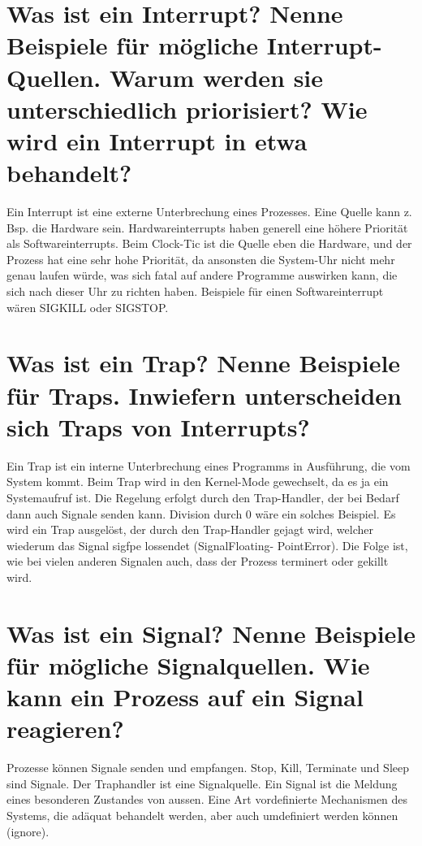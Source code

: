 \documentclass[12pt,a4paper,ngerman]{scrartcl}
\newcommand{\question}[1]{#1}
\newenvironment {answer}
                {}
                {}
\begin{document}
\section{\question{Was ist ein Interrupt? Nenne Beispiele für mögliche Interrupt-Quellen. Warum werden sie unterschiedlich priorisiert? Wie wird ein Interrupt in etwa behandelt?}}
\begin{answer}
Ein Interrupt ist eine externe Unterbrechung eines Prozesses. Eine Quelle kann z. Bsp. die
Hardware sein. Hardwareinterrupts haben generell eine höhere Priorität als Softwareinterrupts.
Beim Clock-Tic ist die Quelle eben die Hardware, und der Prozess hat eine sehr hohe
Priorität, da ansonsten die System-Uhr nicht mehr genau laufen würde, was sich fatal auf
andere Programme auswirken kann, die sich nach dieser Uhr zu richten haben.
Beispiele für einen Softwareinterrupt wären SIGKILL oder SIGSTOP.
\end{answer}

\section{\question{Was ist ein Trap? Nenne Beispiele für Traps. Inwiefern unterscheiden sich Traps von Interrupts?}}
\begin{answer}
Ein Trap ist ein interne Unterbrechung eines Programms in Ausführung, die vom System
kommt. Beim Trap wird in den Kernel-Mode gewechselt, da es ja ein Systemaufruf ist.
Die Regelung erfolgt durch den Trap-Handler, der bei Bedarf dann auch Signale senden
kann. Division durch 0 wäre ein solches Beispiel. Es wird ein Trap ausgelöst, der durch den
Trap-Handler gejagt wird, welcher wiederum das Signal sigfpe lossendet (SignalFloating-
PointError). Die Folge ist, wie bei vielen anderen Signalen auch, dass der Prozess terminert
oder gekillt wird.
\end{answer}

\section{\question{Was ist ein Signal? Nenne Beispiele für mögliche Signalquellen. Wie kann ein Prozess auf ein Signal reagieren?}}
\begin{answer}
Prozesse können Signale senden und empfangen. Stop, Kill, Terminate und Sleep sind
Signale. Der Traphandler ist eine Signalquelle. Ein Signal ist die Meldung eines besonderen
Zustandes von aussen. Eine Art vordefinierte Mechanismen des Systems, die adäquat
behandelt werden, aber auch umdefiniert werden können (ignore).
\end{answer}
\end{document}
